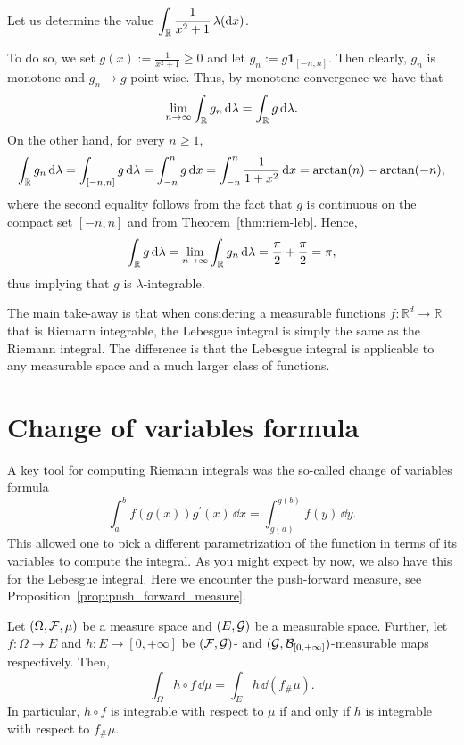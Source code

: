 \begin{example}\label{ex:computation_lebesgue_integral}
	Let us determine the value $\displaystyle \int_{\mathbb R} \frac{1}{x^2+1}\,\lambda(\mathrm{d} x)$.
	
	\noindent To do so, we set $g(x):= \frac{1}{x^2+1}\ge 0$ and let $g_n:= g\mathbf{1}_{[-n,n]}$. Then clearly, $g_n$ is monotone and $g_n\to g$ point-wise. Thus, by monotone convergence we have that
\[
	\lim_{n\to\infty} \int_{\mathbb R} g_n\,\mathrm{d}\lambda = \int_{\mathbb R} g\,\mathrm{d}\lambda.
\]
On the other hand, for every $n\ge 1$,
\[
	\int_{\mathbb R} g_n\,\mathrm{d}\lambda = \int_{[-n,n]} g\,\mathrm{d}\lambda = \int_{-n}^n g\,\mathrm{d} x = \int_{-n}^n \frac{1}{1+x^2}\,\mathrm{d} x = \arctan(n) - \arctan(-n),
\]
where the second equality follows from the fact that $g$ is continuous on the compact set $[-n,n]$ and from Theorem~\ref{thm:riem-leb}. Hence,
\[
	\int_{\mathbb R} g\,\mathrm{d}\lambda=\lim_{n\to\infty} \int_{\mathbb R} g_n\,\mathrm{d}\lambda = \frac{\pi}{2} + \frac{\pi}{2} = \pi,
\]
thus implying that $g$ is $\lambda$-integrable.
\end{example}

\begin{remark}
The main take-away is that when considering a measurable functions $f : \mathbb{R}^d \to \mathbb{R}$ that is Riemann integrable, the Lebesgue integral is simply the same as the Riemann integral. The difference is that the Lebesgue integral is applicable to any measurable space and a much larger class of functions.
\end{remark}

\section{Change of variables formula}
\label{sec:change-of-variables}

A key tool for computing Riemann integrals was the so-called change of variables formula 
\[
	\int_a^b f(g(x)) g^\prime(x) \, \dd x = \int_{g(a)}^{g(b)} f(y) \, \dd y.
\]
This allowed one to pick a different parametrization of the function in terms of its variables to compute the integral. As you might expect by now, we also have this for the Lebesgue integral. Here we encounter the push-forward measure, see Proposition~\ref{prop:push_forward_measure}.


\begin{proposition}\label{prop:change_of_variables}
Let $(\Omega, \mathcal F, \mu)$ be a measure space and $(E,\mathcal G)$ be a measurable space. Further, let $f\colon \Omega \to E$ and $h\colon E \to [0,+\infty]$ be $(\mathcal F,\mathcal G)$- and $(\mathcal G,\mathcal B_{[0,+\infty]})$-measurable maps respectively. Then,
\[
\int_\Omega h \circ f\,\dd \mu = \int_E h \, \dd (f_\# \mu).
\]
In particular, $h \circ f$ is integrable with respect to $\mu$ if and only if $h$ is integrable with respect to $f_\# \mu$.
\end{proposition}

